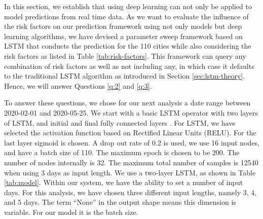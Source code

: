 \documentclass[letterpaper, inpress]{jds} %
\renewcommand{\_}{%
    \textunderscore\hspace{0pt}%
}
\begin{document}
In this section, we establish that using deep learning can not only be
applied to model predictions from real time data. As we want to
evaluate the influence of the risk factors on our prediction framework
using not only models but deep learning algorithms, we have devised a
parameter sweep framework based on LSTM that conducts the prediction
for the 110 cities while also considering the risk factors as listed
in Table \ref{tab:risk-factors}. This framework can query any
combination of risk factors as well as not including any, in which
case it defaults to the traditional LSTM algorithm as introduced in
Section \ref{sec:lstm-theory}. Hence, we will answer Questions
\ref{q:2} and \ref{q:3}.

To answer these questions, we chose for our next analysis a date range
between 2020-02-01 and 2020-05-25. We start with a basic LSTM operator
with two layers of LSTM, and initial and final fully connected layers
\citep{Kadupitiya2020-zq}.  For LSTM, we have selected the activation
function based on Rectified Linear Units (RELU). For the last layer
sigmoid is chosen. A drop out rate of 0.2 is used, we use 16 input
nodes, and have a batch size of 110. The maximum epoch is chosen to be
200. The number of nodes internally is 32. The maximum total number of
samples is 12540 when using 3 days as input length. We use a two-layer
LSTM, as shown in Table \ref{tab:model}. Within our system, we have
the ability to set a number of input days. For this analysis, we have
chosen three different input lengths, namely 3, 4, and 5 days. The
term ``None'' in the output shape means this dimension is
variable. For our model it is the batch size.  
\end{document}
